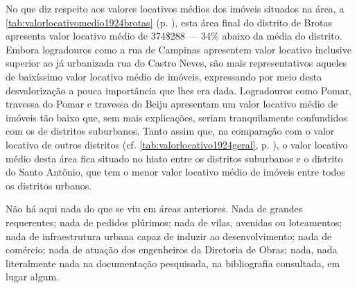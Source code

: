 






No que diz respeito aos valores locativos médios dos imóveis situados na área, a \autoref{tab:valorlocativomedio1924brotas} (p. \pageref{tab:valorlocativomedio1924brotas}), esta área final do distrito de Brotas apresenta valor locativo médio de 374\$288 --- 34\% abaixo da média do distrito. Embora logradouros como a rua de Campinas apresentem valor locativo inclusive superior ao já urbanizada rua do Castro Neves, são mais representativos aqueles de baixíssimo valor locativo médio de imóveis, expressando por meio desta desvalorização a pouca importância que lhes era dada. Logradouros como Pomar, travessa do Pomar e travessa do Beiju apresentam um valor locativo médio de imóveis tão baixo que, sem mais explicações, seriam tranquilamente confundidos com os de distritos suburbanos.  Tanto assim que, na comparação com o valor locativo de outros distritos (cf. \autoref{tab:valorlocativo1924geral}, p. \pageref{tab:valorlocativo1924geral}), o valor locativo médio desta área fica situado no hiato entre os distritos suburbanos e o distrito do Santo Antônio, que tem o menor valor locativo médio de imóveis entre todos os distritos urbanos.







Não há aqui nada do que se viu em áreas anteriores. Nada de grandes requerentes; nada de pedidos plúrimos; nada de vilas, avenidas ou loteamentos; nada de infraestrutura urbana capaz de induzir ao desenvolvimento; nada de comércio; nada de atuação dos engenheiros da Diretoria de Obras; nada, nada literalmente nada na documentação pesquisada, na bibliografia consultada, em lugar algum. 

